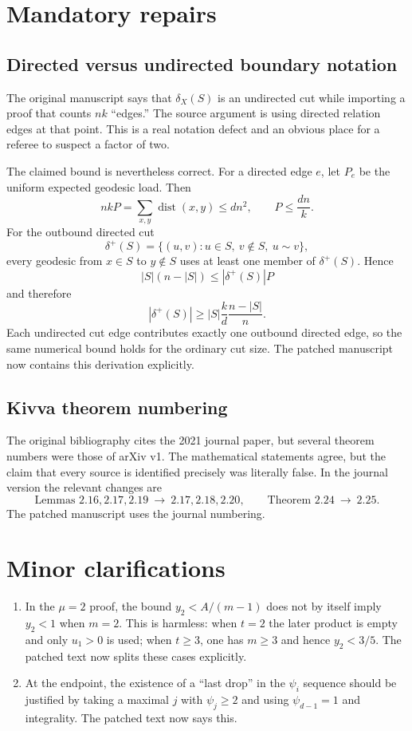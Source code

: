 \documentclass[11pt]{article}
\newcommand{\dist}{\operatorname{dist}}
\begin{document}
\section{Mandatory repairs}
\subsection{Directed versus undirected boundary notation}
The original manuscript says that $\delta_X(S)$ is an undirected cut while importing a proof that counts $nk$ ``edges.''  The source argument is using directed relation edges at that point.  This is a real notation defect and an obvious place for a referee to suspect a factor of two.

The claimed bound is nevertheless correct.  For a directed edge $e$, let $P_e$ be the uniform expected geodesic load.  Then
\[
 nkP=\sum_{x,y}\dist(x,y)\le dn^2,
 \qquad P\le \frac{dn}{k}.
\]
For the outbound directed cut
\[
 \delta^+(S)=\{(u,v):u\in S,\ v\notin S,\ u\sim v\},
\]
every geodesic from $x\in S$ to $y\notin S$ uses at least one member of $\delta^+(S)$.  Hence
\[
 |S|(n-|S|)\le |\delta^+(S)|P
\]
and therefore
\[
 |\delta^+(S)|\ge |S|\frac{k}{d}\frac{n-|S|}{n}.
\]
Each undirected cut edge contributes exactly one outbound directed edge, so the same numerical bound holds for the ordinary cut size.  The patched manuscript now contains this derivation explicitly.

\subsection{Kivva theorem numbering}
The original bibliography cites the 2021 journal paper, but several theorem numbers were those of arXiv v1.  The mathematical statements agree, but the claim that every source is identified precisely was literally false.  In the journal version the relevant changes are
\[
\text{Lemmas }2.16,2.17,2.19\ \longrightarrow\ 2.17,2.18,2.20,
\qquad
\text{Theorem }2.24\ \longrightarrow\ 2.25.
\]
The patched manuscript uses the journal numbering.

\section{Minor clarifications}
\begin{enumerate}[leftmargin=2em,itemsep=0.4em]
\item In the $\mu=2$ proof, the bound $y_2<A/(m-1)$ does not by itself imply $y_2<1$ when $m=2$.  This is harmless: when $t=2$ the later product is empty and only $u_1>0$ is used; when $t\ge3$, one has $m\ge3$ and hence $y_2<3/5$.  The patched text now splits these cases explicitly.
\item At the endpoint, the existence of a ``last drop'' in the $\psi_i$ sequence should be justified by taking a maximal $j$ with $\psi_j\ge2$ and using $\psi_{d-1}=1$ and integrality.  The patched text now says this.
\end{enumerate}
\end{document}
